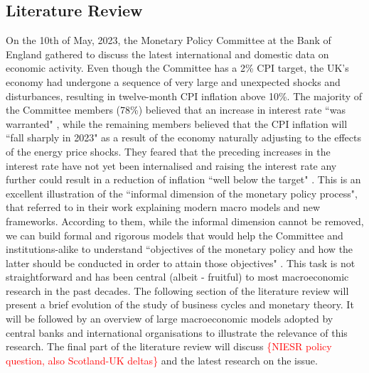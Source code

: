 \subsection{Literature Review}

On the 10th of May, 2023, the Monetary Policy Committee at the Bank of England gathered to discuss the latest international and domestic data on economic activity. Even though the Committee has a 2\% CPI target, the UK's economy had undergone a sequence of very large and unexpected shocks and disturbances, resulting in twelve-month CPI inflation above 10\%. The majority of the Committee members (78\%) believed that an increase in interest rate ``was warranted" \parencite[4]{boe_2023_monetary}, while the remaining members believed that the CPI inflation will ``fall sharply in 2023" \parencite[5]{boe_2023_monetary} as a result of the economy naturally adjusting to the effects of the energy price shocks. They feared that the preceding increases in the interest rate have not yet been internalised and raising the interest rate any further could result in a reduction of inflation ``well below the target" \parencite[5]{boe_2023_monetary}. This is an excellent illustration of the ``informal dimension of the monetary policy process", that \parencite[26]{gals_2007_macroeconomic} referred to in their work explaining modern macro models and new frameworks. According to them, while the informal dimension cannot be removed, we can build formal and rigorous models that would help the Committee and institutions-alike to understand ``objectives of the monetary policy and how the latter should be conducted in order to attain those objectives" \parencite[2]{jordigal_2015_monetary}. This task is not straightforward and has been central (albeit - fruitful) to most macroeconomic research in the past decades. The following section of the literature review will present a brief evolution of the study of business cycles and monetary theory. It will be followed by an overview of large macroeconomic models adopted by central banks and international organisations to illustrate the relevance of this research. The final part of the literature review will discuss \textcolor{red}{\{NIESR policy question, also Scotland-UK deltas\}} and the latest research on the issue.

